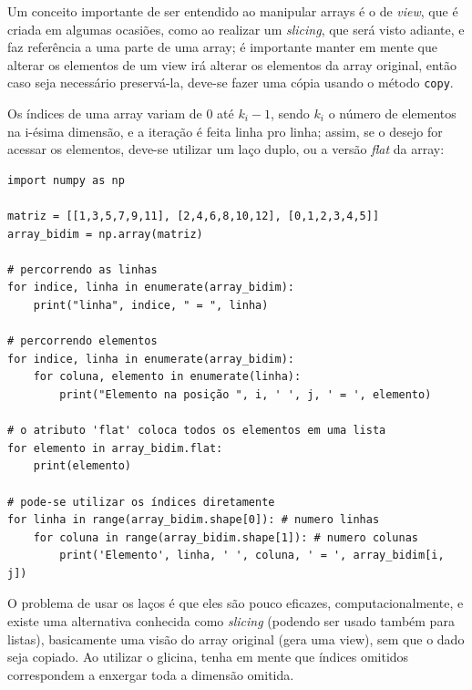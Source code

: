 \documentclass[../numerical_methods.tex]{subfiles}
\begin{document}
Um conceito importante de ser entendido ao manipular arrays é o de \textit{view}, que é criada em algumas ocasiões, como ao realizar um \textit{slicing}, que será visto adiante, e faz referência a uma parte de uma array; é importante manter em mente que alterar os elementos de um view irá alterar os elementos da array original, então caso seja necessário preservá-la, deve-se fazer uma cópia usando o método \texttt{copy}.

Os índices de uma array variam de 0 até \(k_{i}-1\), sendo \(k_{i}\) o número de elementos na i-ésima dimensão, e a iteração é feita linha pro linha; assim, se o desejo for acessar os elementos, deve-se utilizar um laço duplo, ou a versão \textit{flat} da array:
\begin{listing}[H]
	\begin{verbatim}
import numpy as np

matriz = [[1,3,5,7,9,11], [2,4,6,8,10,12], [0,1,2,3,4,5]] 
array_bidim = np.array(matriz)

# percorrendo as linhas 
for indice, linha in enumerate(array_bidim):
    print("linha", indice, " = ", linha)

# percorrendo elementos 
for indice, linha in enumerate(array_bidim):
    for coluna, elemento in enumerate(linha):
        print("Elemento na posição ", i, ' ', j, ' = ', elemento)

# o atributo 'flat' coloca todos os elementos em uma lista 
for elemento in array_bidim.flat:
    print(elemento)

# pode-se utilizar os índices diretamente 
for linha in range(array_bidim.shape[0]): # numero linhas
    for coluna in range(array_bidim.shape[1]): # numero colunas
        print('Elemento', linha, ' ', coluna, ' = ', array_bidim[i, j])
\end{verbatim}
\end{listing}
O problema de usar os laços é que eles são pouco eficazes, computacionalmente, e existe uma alternativa conhecida como \textit{slicing} (podendo ser usado também para listas), basicamente uma visão do array original (gera uma view), sem que o dado seja copiado. Ao utilizar o glicina, tenha em mente que índices omitidos correspondem a enxergar toda a dimensão omitida.
\end{document}
